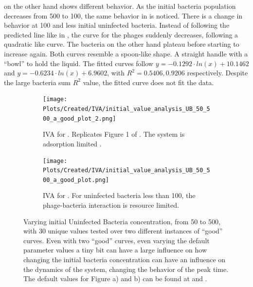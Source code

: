  on the other hand shows different behavior. 
As the initial bacteria population decreases from 500 to 100, the same behavior in  is noticed.
There is a change in behavior at 100 and less initial uninfected bacteria. 
Instead of following the predicted line like in , the curve for the phages suddenly decreases, following a quadratic like curve. 
The bacteria on the other hand plateau before starting to increase again. 
Both curves resemble a spoon-like shape. A straight handle with a “bowl” to hold the liquid. 
The fitted curves follow $y = -0.1292\cdot ln(x) + 10.1462$ and $y = -0.6234\cdot ln(x)+6.9602$, with $R^2=0.5406, 0.9206$ respectively. 
Despite the large bacteria sum $R^2$ value, the fitted curve does not fit the data. 

\begin{figure}
    \centering
    \begin{subfigure}{1\linewidth}
        \centering
        \texttt{[image: Plots/Created/IVA/initial\_value\_analysis\_UB\_50\_500\_a\_good\_plot\_2.png]}
        \caption{
            IVA for . 
            Replicates Figure 1 of \citet{mullaExtremeDiversityPhage2024}. 
            The system is adsorption limited \cite{mullaExtremeDiversityPhage2024}. 
        }
        \label{fig:created:initial_value_analysis_UB_50_500_a_good_plot_2}
    \end{subfigure}
    \hfill
    \begin{subfigure}{1\linewidth}
        \centering
        \texttt{[image: Plots/Created/IVA/initial\_value\_analysis\_UB\_50\_500\_a\_good\_plot.png]}
        \caption{
            IVA for . 
            For uninfected bacteria less than 100, the phage-bacteria interaction is resource limited. 
        }
        \label{fig:created:initial_value_analysis_UB_50_500_a_good_plot}
    \end{subfigure}
    \caption{
        Varying initial Uninfected Bacteria concentration, from 50 to 500, with 30 unique values tested over two different instances of “good” curves. 
        Even with two “good” curves, even varying the default parameter values a tiny bit can have a large influence on how changing the initial bacteria concentration can have an influence on the dynamics of the system, changing the behavior of the peak time. 
        The default values for Figure a) and b) can be found at  and . 
    }
\end{figure}

